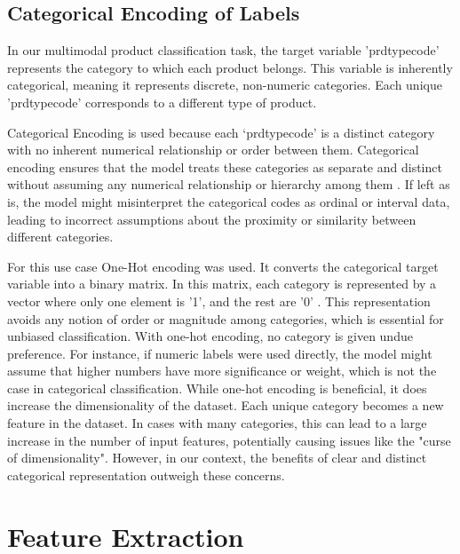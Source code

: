 \subsection{Categorical Encoding of Labels}

In our multimodal product classification task, the target variable 'prdtypecode' represents the category to which each product belongs. This variable is inherently categorical, meaning it represents discrete, non-numeric categories. Each unique 'prdtypecode' corresponds to a different type of product.

Categorical Encoding is used because each ‘prdtypecode’ is a distinct category with no inherent numerical relationship or order between them. Categorical encoding ensures that the model treats these categories as separate and distinct without assuming any numerical relationship or hierarchy among them \cite{potdar-2017}. If left as is, the model might misinterpret the categorical codes as ordinal or interval  data, leading to incorrect assumptions about the proximity or similarity between different categories.

For this use case One-Hot encoding was used. It converts the categorical target variable into a binary matrix. In this matrix, each category is represented by a vector where only one element is '1', and the rest are '0' \cite{cerda-2018}. This representation avoids any notion of order or magnitude among categories, which is essential for unbiased classification.
With one-hot encoding, no category is given undue preference. For instance, if numeric labels were used directly, the model might assume that higher numbers have more significance or weight, which is not the case in categorical classification.
While one-hot encoding is beneficial, it does increase the dimensionality of the dataset. Each unique category becomes a new feature in the dataset. In cases with many categories, this can lead to a large increase in the number of input features, potentially causing issues like the "curse of dimensionality"\cite{altman-2018}. However, in our context, the benefits of clear and distinct categorical representation outweigh these concerns.


\section{Feature Extraction}

